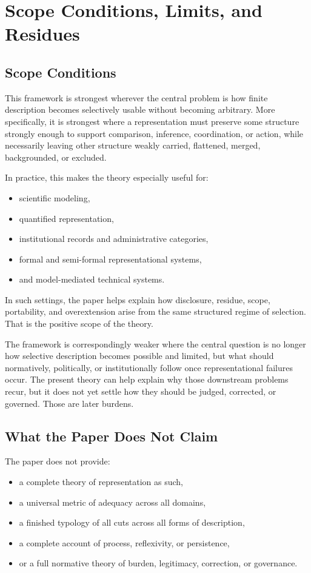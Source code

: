 \documentclass[11pt]{article}
\begin{document}
\section{Scope Conditions, Limits, and Residues}

\subsection{Scope Conditions}

This framework is strongest wherever the central problem is how finite description becomes selectively usable without becoming arbitrary. More specifically, it is strongest where a representation must preserve some structure strongly enough to support comparison, inference, coordination, or action, while necessarily leaving other structure weakly carried, flattened, merged, backgrounded, or excluded.

In practice, this makes the theory especially useful for:
\begin{itemize}
    \item scientific modeling,
    \item quantified representation,
    \item institutional records and administrative categories,
    \item formal and semi-formal representational systems,
    \item and model-mediated technical systems.
\end{itemize}

In such settings, the paper helps explain how disclosure, residue, scope, portability, and overextension arise from the same structured regime of selection. That is the positive scope of the theory.

The framework is correspondingly weaker where the central question is no longer how selective description becomes possible and limited, but what should normatively, politically, or institutionally follow once representational failures occur. The present theory can help explain why those downstream problems recur, but it does not yet settle how they should be judged, corrected, or governed. Those are later burdens.

\subsection{What the Paper Does Not Claim}

The paper does not provide:
\begin{itemize}
    \item a complete theory of representation as such,
    \item a universal metric of adequacy across all domains,
    \item a finished typology of all cuts across all forms of description,
    \item a complete account of process, reflexivity, or persistence,
    \item or a full normative theory of burden, legitimacy, correction, or governance.
\end{itemize}
\end{document}
